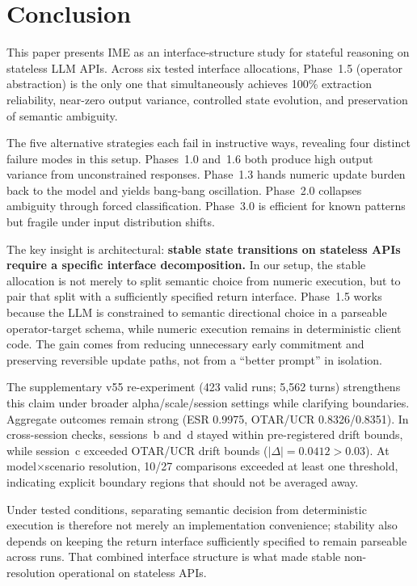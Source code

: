 \documentclass[11pt,a4paper]{article}
\begin{document}
\section{Conclusion}
\label{sec:conclusion}

This paper presents IME as an interface-structure study for stateful reasoning
on stateless LLM APIs. Across six tested interface allocations, Phase~1.5
(operator abstraction) is the only one that simultaneously achieves 100\%
extraction reliability, near-zero output variance, controlled state evolution,
and preservation of semantic ambiguity.

The five alternative strategies each fail in instructive ways, revealing four
distinct failure modes in this setup. Phases~1.0 and~1.6 both produce high
output variance from unconstrained responses. Phase~1.3 hands numeric update
burden back to the model and yields bang-bang oscillation. Phase~2.0 collapses
ambiguity through forced classification. Phase~3.0 is efficient for known
patterns but fragile under input distribution shifts.

The key insight is architectural: \textbf{stable state transitions on stateless
APIs require a specific interface decomposition.} In our setup, the stable
allocation is not merely to split semantic choice from numeric execution, but
to pair that split with a sufficiently specified return interface. Phase~1.5
works because the LLM is constrained to semantic directional choice in a
parseable operator-target schema, while numeric execution remains in
deterministic client code. The gain comes from reducing unnecessary early
commitment and preserving reversible update paths, not from a ``better prompt''
in isolation.

The supplementary v55 re-experiment (423 valid runs; 5{,}562 turns) strengthens
this claim under broader alpha/scale/session settings while clarifying
boundaries. Aggregate outcomes remain strong (ESR 0.9975, OTAR/UCR
0.8326/0.8351). In cross-session checks, sessions~b and~d stayed within
pre-registered drift bounds, while session~c exceeded OTAR/UCR drift bounds
($|\Delta|=0.0412 > 0.03$). At model$\times$scenario resolution, 10/27
comparisons exceeded at least one threshold, indicating explicit boundary
regions that should not be averaged away.

Under tested conditions, separating semantic decision from deterministic
execution is therefore not merely an implementation convenience; stability also
depends on keeping the return interface sufficiently specified to remain
parseable across runs. That combined interface structure is what made stable
non-resolution operational on stateless APIs.
\end{document}
